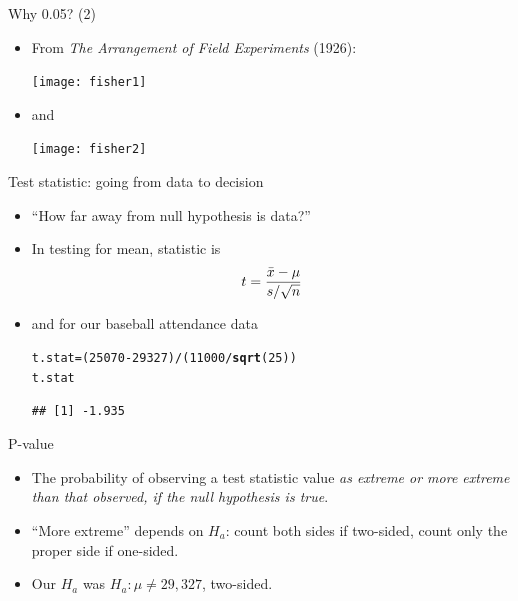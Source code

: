 \documentclass[unknownkeysallowed]{beamer}\usepackage[]{graphicx}\usepackage[]{color}
\makeatletter
\newcommand{\hlnum}[1]{\textcolor[rgb]{0.686,0.059,0.569}{#1}}%
\newcommand{\hlopt}[1]{\textcolor[rgb]{0,0,0}{#1}}%
\newcommand{\hlstd}[1]{\textcolor[rgb]{0.345,0.345,0.345}{#1}}%
\newcommand{\hlkwb}[1]{\textcolor[rgb]{0.69,0.353,0.396}{#1}}%
\newcommand{\hlkwd}[1]{\textcolor[rgb]{0.737,0.353,0.396}{\textbf{#1}}}%
\newenvironment{kframe}{%
 \def\at@end@of@kframe{}%
 \ifinner\ifhmode%
  \def\at@end@of@kframe{\end{minipage}}%
  \begin{minipage}{\columnwidth}%
 \fi\fi%
 \def\FrameCommand##1{\hskip\@totalleftmargin \hskip-\fboxsep
 \colorbox{shadecolor}{##1}\hskip-\fboxsep
     \hskip-\linewidth \hskip-\@totalleftmargin \hskip\columnwidth}%
 \MakeFramed {\advance\hsize-\width
   \@totalleftmargin\z@ \linewidth\hsize
   \@setminipage}}%
 {\par\unskip\endMakeFramed%
 \at@end@of@kframe}
\newenvironment{knitrout}{}{} %
\makeatother
\begin{document}
\begin{frame}[fragile]{Why 0.05? (2)}
  
  \begin{itemize}
  \item From \emph{The Arrangement of Field Experiments}
    (1926):
    
    \texttt{[image: fisher1]}
    
  \item and
    
    \texttt{[image: fisher2]}
  \end{itemize}
  
\end{frame}

\begin{frame}[fragile]{Test statistic: going from data to decision}
  
  \begin{itemize}
  \item ``How far away from null hypothesis is data?''
  \item In testing for mean, statistic is
    $$ t = { \bar{x} - \mu \over s/\sqrt{n} }$$
  \item and for our baseball attendance data
\begin{knitrout}
\color{fgcolor}\begin{kframe}
\begin{alltt}
\hlstd{t.stat}\hlkwb{=}\hlstd{(}\hlnum{25070}\hlopt{-}\hlnum{29327}\hlstd{)}\hlopt{/}\hlstd{(}\hlnum{11000}\hlopt{/}\hlkwd{sqrt}\hlstd{(}\hlnum{25}\hlstd{))}
\hlstd{t.stat}
\end{alltt}
\begin{verbatim}
## [1] -1.935
\end{verbatim}
\end{kframe}
\end{knitrout}

  \end{itemize}
  
\end{frame}

\begin{frame}[fragile]{P-value}
  
  \begin{itemize}
  \item The probability of observing a test statistic value \emph{as
      extreme or more extreme than that observed, if the null
      hypothesis is true}.
  \item ``More extreme'' depends on $H_a$: count both sides if
    two-sided, count only the proper side if one-sided.
  \item Our $H_a$ was $H_a:  \mu \ne 29,327$, two-sided.
  \end{itemize}
  
\end{frame}
\end{document}
